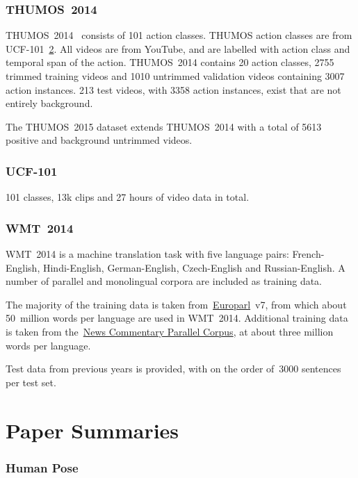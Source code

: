 \documentclass[a4paper, 12pt]{article}
\begin{document}
\section{THUMOS~2014~\cite{DBLP:journals/corr/IdreesZJGLSS16}}
\label{thumos}

THUMOS~2014~\cite{DBLP:journals/corr/IdreesZJGLSS16} consists of 101 action
classes. THUMOS action classes are from UCF-101~\ref{ucf101}. All videos are
from YouTube, and are labelled with action class and temporal span of the
action. THUMOS~2014 contains 20 action classes, 2755 trimmed training videos
and 1010 untrimmed validation videos containing 3007 action instances. 213 test
videos, with 3358 action instances, exist that are not entirely background.

The THUMOS~2015 dataset extends THUMOS~2014 with a total of 5613 positive and
background untrimmed videos.

\section{UCF-101\cite{DBLP:journals/corr/abs-1212-0402}}
\label{ucf101}

101 classes, 13k clips and 27 hours of video data in total.

\section{WMT~2014~\cite{wmt14-translation-website}}
\label{wmt2014}

WMT~2014 is a machine translation task with five language pairs:
French-English, Hindi-English, German-English, Czech-English and
Russian-English. A number of parallel and monolingual corpora are included as
training data.

The majority of the training data is taken
from~\href{http://www.statmt.org/europarl/}{Europarl}~v7, from which about
50~million words per language are used in WMT~2014. Additional training data is
taken from the~\href{http://www.casmacat.eu/corpus/news-commentary.html}{News
Commentary Parallel Corpus}, at about three million words per language.

Test data from previous years is provided, with on the order of~\num{3000}
sentences per test set.

\part{Paper Summaries}

\section{Human Pose}
\end{document}
